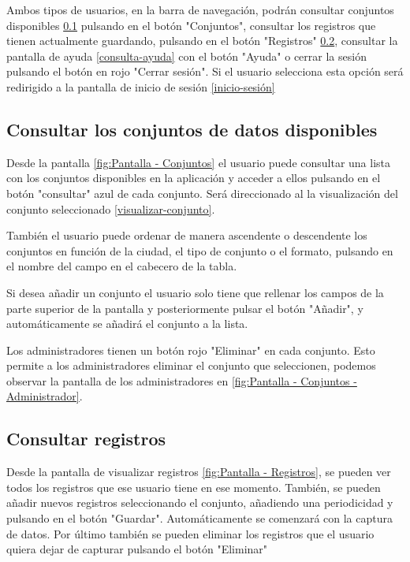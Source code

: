 Ambos tipos de usuarios, en la barra de navegación, podrán consultar conjuntos disponibles \ref{consultar-conjuntos} pulsando en el botón "Conjuntos", consultar los registros que tienen actualmente guardando, pulsando en el botón "Registros" \ref{consultar-registros}, consultar la pantalla de ayuda \ref{consulta-ayuda} con el botón "Ayuda" o cerrar la sesión pulsando el botón en rojo "Cerrar sesión". Si el usuario selecciona esta opción será redirigido a la pantalla de inicio de sesión \ref{inicio-sesión}

\subsection{Consultar los conjuntos de datos disponibles}\label{consultar-conjuntos}
Desde la pantalla \ref{fig:Pantalla - Conjuntos} el usuario puede consultar una lista con los conjuntos disponibles en la aplicación y acceder a ellos pulsando en el botón "consultar" azul de cada conjunto. Será direccionado al la visualización del conjunto seleccionado \ref{visualizar-conjunto}.

También el usuario puede ordenar de manera ascendente o descendente los conjuntos en función de la ciudad, el tipo de conjunto o el formato, pulsando en el nombre del campo en el cabecero de la tabla.

Si desea añadir un conjunto el usuario solo tiene que rellenar los campos de la parte superior de  la pantalla y posteriormente pulsar el botón "Añadir", y automáticamente se añadirá el conjunto a la lista.

Los administradores tienen un botón rojo "Eliminar" en cada conjunto. Esto permite a los administradores eliminar el conjunto que seleccionen, podemos observar la pantalla de los administradores en \ref{fig:Pantalla - Conjuntos - Administrador}.

\subsection{Consultar registros}\label{consultar-registros}
Desde la pantalla de visualizar registros \ref{fig:Pantalla - Registros}, se pueden ver todos los registros que ese usuario tiene en ese momento.
También, se pueden añadir nuevos registros seleccionando el conjunto, añadiendo una periodicidad y pulsando en el botón "Guardar". Automáticamente se comenzará con la captura de datos.
Por último también se pueden eliminar los registros que el usuario quiera dejar de capturar pulsando el botón "Eliminar"

